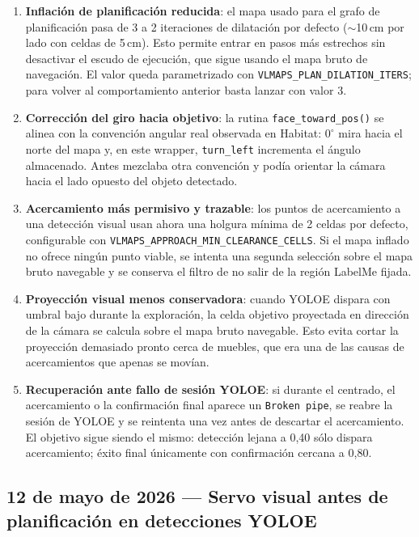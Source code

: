 \documentclass[11pt,a4paper]{article}
\begin{document}
\begin{enumerate}
  \item \textbf{Inflación de planificación reducida}: el mapa usado para el
        grafo de planificación pasa de 3 a 2 iteraciones de dilatación por
        defecto (\(\sim\)10\,cm por lado con celdas de 5\,cm). Esto permite
        entrar en pasos más estrechos sin desactivar el escudo de ejecución,
        que sigue usando el mapa bruto de navegación. El valor queda
        parametrizado con \texttt{VLMAPS\_PLAN\_DILATION\_ITERS}; para volver
        al comportamiento anterior basta lanzar con valor 3.
  \item \textbf{Corrección del giro hacia objetivo}: la rutina
        \texttt{face\_toward\_pos()} se alinea con la convención angular real
        observada en Habitat: \(0^\circ\) mira hacia el norte del mapa y, en
        este wrapper, \texttt{turn\_left} incrementa el ángulo almacenado.
        Antes mezclaba otra convención y podía orientar la cámara hacia el lado
        opuesto del objeto detectado.
  \item \textbf{Acercamiento más permisivo y trazable}: los puntos de
        acercamiento a una detección visual usan ahora una holgura mínima de
        2 celdas por defecto, configurable con
        \texttt{VLMAPS\_APPROACH\_MIN\_CLEARANCE\_CELLS}. Si el mapa inflado no
        ofrece ningún punto viable, se intenta una segunda selección sobre el
        mapa bruto navegable y se conserva el filtro de no salir de la región
        LabelMe fijada.
  \item \textbf{Proyección visual menos conservadora}: cuando YOLOE dispara
        con umbral bajo durante la exploración, la celda objetivo proyectada en
        dirección de la cámara se calcula sobre el mapa bruto navegable. Esto
        evita cortar la proyección demasiado pronto cerca de muebles, que era
        una de las causas de acercamientos que apenas se movían.
  \item \textbf{Recuperación ante fallo de sesión YOLOE}: si durante el
        centrado, el acercamiento o la confirmación final aparece un
        \texttt{Broken pipe}, se reabre la sesión de YOLOE y se reintenta una
        vez antes de descartar el acercamiento. El objetivo sigue siendo el
        mismo: detección lejana a 0,40 sólo dispara acercamiento; éxito final
        únicamente con confirmación cercana a 0,80.
\end{enumerate}

\subsection*{12 de mayo de 2026 --- Servo visual antes de planificación en detecciones YOLOE}
\end{document}
